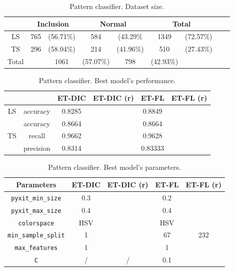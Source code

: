 \begin{table}
	\small
	\center
	\begin{tabular}{|c|cc|cc|cc|cc|}
		\hline
		& \multicolumn{2}{|c|}{Inclusion} & \multicolumn{2}{c|}{Normal} & \multicolumn{2}{c|}{Total}\\
		\hline		
		LS & 765 & \tiny (56.71\%) & 584 & \tiny (43.29\% & 1349 & \tiny (72.57\%)\\
		TS & 296 & \tiny (58.04\%) & 214 & \tiny (41.96\%) & 510 & \tiny (27.43\%)\\
		\hline
		Total & & 1061 & \tiny (57.07\%) & 798 & \tiny (42.93\%) & \multicolumn{2}{c|}{}\\
		\hline
	\end{tabular}
	\caption{Pattern classifier. Dataset size.}
	\label{tab:pattern_classif_dataset_size}
\end{table}

\begin{table}
	\small
	\center 
	\begin{tabular}{|c|c|c|c|c|c|}
		\hline
		& & ET-DIC & ET-DIC (r) & ET-FL & ET-FL (r) \\
		\hline
		LS & accuracy & 0.8285 & & 0.8849 & \\
		\hline
		\multirow{3}{*}{TS} & accuracy & 0.8664 & & 0.8664 & \\
		& recall & 0.9662 & & 0.9628 & \\
		& precision & 0.8314 & & 0.83333 & \\
		\hline
	\end{tabular}
	\caption{Pattern classifier. Best model's performance.}
	\label{tab:pattern_classif_best_scores}
\end{table}

\begin{table}
	\small
	\center 
	\begin{tabular}{|c|c|c|c|c|}
		\hline
		Parameters & ET-DIC & ET-DIC (r) & ET-FL & ET-FL (r) \\
		\hline		
		\texttt{pyxit\_min\_size} & 0.3 & & 0.2 & \\
		\texttt{pyxit\_max\_size} & 0.4 & & 0.4 & \\
		\texttt{colorspace} & HSV & & HSV & \\
		\texttt{min\_sample\_split} & 1 & & 67 & 232\\
		\texttt{max\_features} & 1 & & 1 & \\ 
		\texttt{C} & / & / & 0.1 & \\
		\hline
	\end{tabular}
	\caption{Pattern classifier. Best model's parameters.}
	\label{tab:pattern_classif_best_params}
\end{table}

